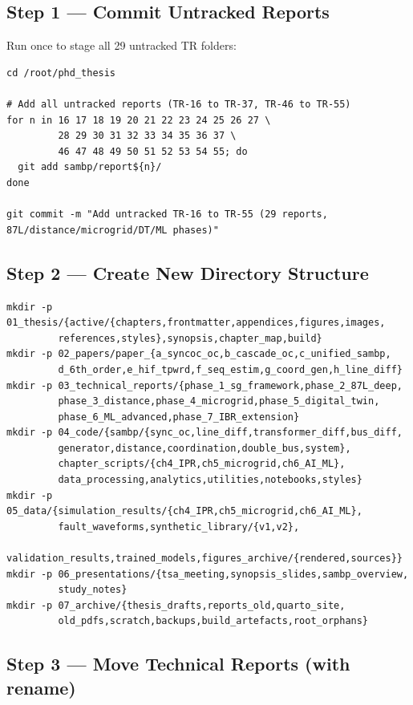 \documentclass[11pt,a4paper]{article}
\begin{document}
\subsection{Step 1 — Commit Untracked Reports}

Run once to stage all 29 untracked TR folders:
\begin{verbatim}
cd /root/phd_thesis

# Add all untracked reports (TR-16 to TR-37, TR-46 to TR-55)
for n in 16 17 18 19 20 21 22 23 24 25 26 27 \
         28 29 30 31 32 33 34 35 36 37 \
         46 47 48 49 50 51 52 53 54 55; do
  git add sambp/report${n}/
done

git commit -m "Add untracked TR-16 to TR-55 (29 reports, 87L/distance/microgrid/DT/ML phases)"
\end{verbatim}

\subsection{Step 2 — Create New Directory Structure}

\begin{verbatim}
mkdir -p 01_thesis/{active/{chapters,frontmatter,appendices,figures,images,
         references,styles},synopsis,chapter_map,build}
mkdir -p 02_papers/paper_{a_syncoc_oc,b_cascade_oc,c_unified_sambp,
         d_6th_order,e_hif_tpwrd,f_seq_estim,g_coord_gen,h_line_diff}
mkdir -p 03_technical_reports/{phase_1_sg_framework,phase_2_87L_deep,
         phase_3_distance,phase_4_microgrid,phase_5_digital_twin,
         phase_6_ML_advanced,phase_7_IBR_extension}
mkdir -p 04_code/{sambp/{sync_oc,line_diff,transformer_diff,bus_diff,
         generator,distance,coordination,double_bus,system},
         chapter_scripts/{ch4_IPR,ch5_microgrid,ch6_AI_ML},
         data_processing,analytics,utilities,notebooks,styles}
mkdir -p 05_data/{simulation_results/{ch4_IPR,ch5_microgrid,ch6_AI_ML},
         fault_waveforms,synthetic_library/{v1,v2},
         validation_results,trained_models,figures_archive/{rendered,sources}}
mkdir -p 06_presentations/{tsa_meeting,synopsis_slides,sambp_overview,
         study_notes}
mkdir -p 07_archive/{thesis_drafts,reports_old,quarto_site,
         old_pdfs,scratch,backups,build_artefacts,root_orphans}
\end{verbatim}

\subsection{Step 3 — Move Technical Reports (with rename)}
\end{document}

